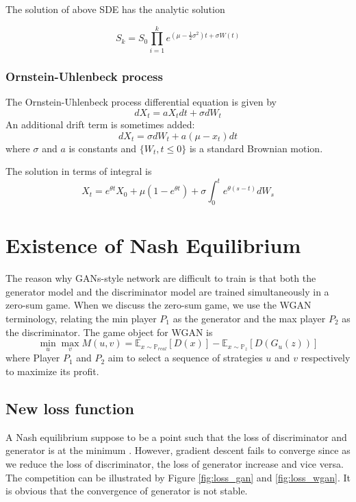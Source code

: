 \documentclass{article}
\begin{document}
	The solution of above SDE has the analytic solution
	
	\begin{equation}
	S_{k} = S_{0} \prod_{i=1}^{k}e^{\left(\mu-\frac{1}{2}\sigma^{2}\right)t+\sigma W(t)}
	\label{eq:bm_process}
	\end{equation}
	
	\subsubsection{Ornstein-Uhlenbeck process}
	The Ornstein-Uhlenbeck process differential equation is given by
	\begin{equation}
	dX_t = aX_tdt + \sigma dW_t 
	\label{eq:ornuh_diff}
	\end{equation}
	An additional drift term is sometimes added:
	\begin{equation}
	dX_t = \sigma dW_t +a (\mu-x_t)dt
	\label{eq:ornuh_diff_mean}
	\end{equation}
	where $\sigma$ and $a$ is constants and $\{W_t, t \leq 0\}$ is a standard Brownian motion.
	
	The solution in terms of integral is 
	\begin{equation}
	X_t = e^{\theta t}X_0 + \mu(1-e^{ \theta t}) +\sigma \int_{0}^{t}e^{ \theta(s-t)}dW_s
	\end{equation}
	
	\section{Existence of Nash Equilibrium}
	
	 The reason why GANs-style network are difficult to train is that both the generator model and the discriminator model are trained simultaneously in a zero-sum game.
	 When we discuss the zero-sum game, we use the WGAN terminology, relating the min player $P_{1}$ as the generator and the max player $P_{2}$ as the discriminator.
	 The game object for WGAN is 
	 \begin{equation}
	 \min_{u}\max_{v} M(u,v) =  \mathbb{E}_{x \sim \mathbb{P}_{real}}[D(x)] -\mathbb{E}_{x \sim \mathbb{P}_{z}}[D(G_{u}(z))]
	 \label{eq:wgan_dis}
	 \end{equation}
	 where Player $P_{1}$ and $P_{2}$ aim to select a sequence of strategies $u$ and $v$ respectively to maximize its profit.
	 
	 
	 
	 
	 
	 \subsection{New loss function}
	A Nash equilibrium suppose to be a point such that the loss of discriminator and generator is at the minimum \cite{arora}.
	However, gradient descent fails to converge since as we reduce the loss of discriminator, the loss of generator increase and vice versa. 
	The competition can be illustrated by Figure \ref{fig:loss_gan} and \ref{fig:loss_wgan}. 
	It  is obvious that the convergence of generator is not stable.  
	
\end{document}
